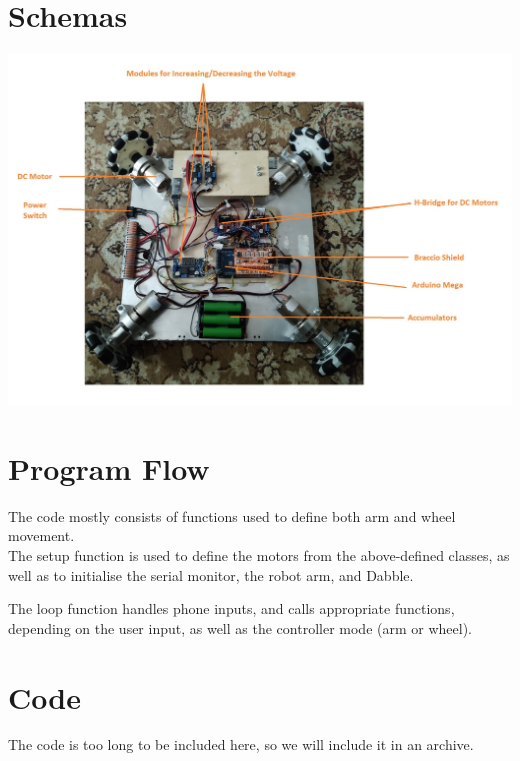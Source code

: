 \documentclass{article}
\begin{document}
	\section{Schemas}
		
		\includegraphics[scale = 0.25s]{mountingScheme.jpeg}
	
	\section{Program Flow}
	The code mostly consists of functions used to define both arm and wheel movement.\\
	
	The setup function is used to define the motors from the above-defined classes, as well as to initialise the serial monitor, the robot arm, and Dabble.
	
	The loop function handles phone inputs, and calls appropriate functions, depending on the user input, as well as the controller mode (arm or wheel).
	
	
	\section{Code}
	The code is too long to be included here, so we will include it in an archive.
	
\end{document}
